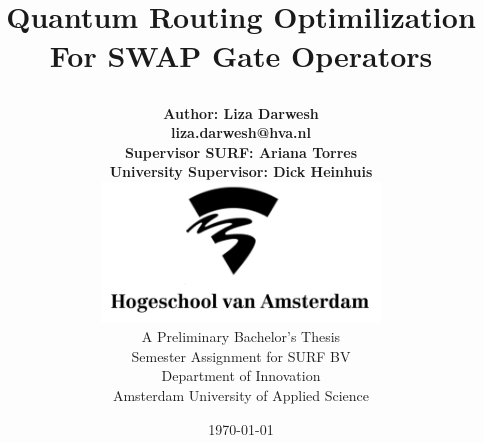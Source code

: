 \documentclass[12pt]{book}
\title{{\fontsize{25}{24}\sffamily\textbf{Quantum Routing Optimilization For SWAP Gate Operators}}
	\author{
	\large\textbf{Author: Liza Darwesh}\\
	\small\textbf{liza.darwesh@hva.nl}
	    \vspace{2em}\\
	    \large\textbf{Supervisor SURF: Ariana Torres}\\
	    \large\textbf{University Supervisor: Dick Heinhuis}
	    \vspace{4em}\\
		\includegraphics[width=74mm]{figures/hva-logo-png-7.png}\vspace{4em}\\
		A Preliminary Bachelor's Thesis\\
		Semester Assignment for SURF BV \\
		Department of Innovation \\
		Amsterdam University of Applied Science}
	\huge\date{\today}
}
\begin{document}

\ifDownscaledFinalDoc
	\fontsize{\TextSize}{\BaseLineSkip}
	\selectfont
\fi

\ifDraft
	\doublespacing
\fi

\renewcommand{\familydefault}{\sfdefault} %

\maketitle
\frontmatter
\normalfont\rmfamily



%
\tableofcontents
\listoffigures

\mainmatter

%
%





%
%

\backmatter

%
%

%
%
%

%
%




\end{document}
